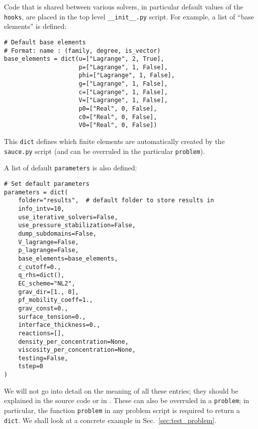 \documentclass[a4paper,10pt]{article}
\begin{document}
Code that is shared between various solvers, in particular default values of the \texttt{hooks}, are placed in the top level \texttt{\_\_init\_\_.py} script.
For example, a list of ``base elements'' is defined:
\begin{verbatim}
# Default base elements
# Format: name : (family, degree, is_vector)
base_elements = dict(u=["Lagrange", 2, True],
                     p=["Lagrange", 1, False],
                     phi=["Lagrange", 1, False],
                     g=["Lagrange", 1, False],
                     c=["Lagrange", 1, False],
                     V=["Lagrange", 1, False],
                     p0=["Real", 0, False],
                     c0=["Real", 0, False],
                     V0=["Real", 0, False])
\end{verbatim}
This \texttt{dict} defines which finite elements are automatically created by the \texttt{sauce.py} script (and can be overruled in the particular \texttt{problem}). 

A list of default \texttt{parameters} is also defined:
\begin{verbatim}
# Set default parameters
parameters = dict(
    folder="results",  # default folder to store results in
    info_intv=10,
    use_iterative_solvers=False,
    use_pressure_stabilization=False,
    dump_subdomains=False,
    V_lagrange=False,
    p_lagrange=False,
    base_elements=base_elements,
    c_cutoff=0.,
    q_rhs=dict(),
    EC_scheme="NL2",
    grav_dir=[1., 0],
    pf_mobility_coeff=1.,
    grav_const=0.,
    surface_tension=0.,
    interface_thickness=0.,
    reactions=[],
    density_per_concentration=None,
    viscosity_per_concentration=None,
    testing=False,
    tstep=0
)
\end{verbatim}
We will not go into detail on the meaning of all these entries; they should be explained in the source code or in \cite{linga2018b}.
These can also be overruled in a \texttt{problem}; in particular, the function \texttt{problem} in any problem script is required to return a \texttt{dict}.
We shall look at a concrete example in Sec.\ \ref{sec:test_problem}.
\end{document}

